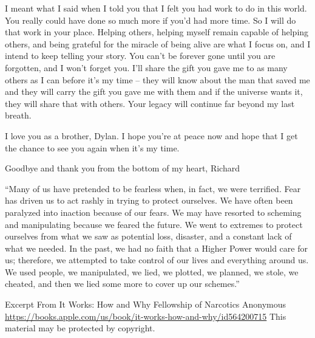 \documentclass[11pt]{article}
\begin{document}
I meant what I said when I told you that I felt you had work to do in this world.  You really could have done so much more if you'd had more time. So I will do that work in your place.   Helping others, helping myself remain capable of helping others, and being grateful for the miracle of being alive are what I focus on, and I intend to keep telling your story. You can't be forever gone until you are forgotten, and I won't forget you.  I'll share the gift you gave me to as many others as I can before it's my time -- they will know about the man that saved me and they will carry the gift you gave me with them and if the universe wants it, they will share that with others.  Your legacy will continue far beyond my last breath.

I love you as a brother, Dylan. I hope you're at peace now and hope that I get the chance to see you again when it's my time.

Goodbye and thank you from the bottom of my heart,
Richard


“Many of us have pretended to be fearless when, in fact, we were terrified. Fear has driven us to act rashly in trying to protect ourselves. We have often been paralyzed into inaction because of our fears. We may have resorted to scheming and manipulating because we feared the future. We went to extremes to protect ourselves from what we saw as potential loss, disaster, and a constant lack of what we needed. In the past, we had no faith that a Higher Power would care for us; therefore, we attempted to take control of our lives and everything around us. We used people, we manipulated, we lied, we plotted, we planned, we stole, we cheated, and then we lied some more to cover up our schemes.”

Excerpt From
It Works: How and Why
Fellowship of Narcotics Anonymous
\url{https://books.apple.com/us/book/it-works-how-and-why/id564200715}
This material may be protected by copyright.
\end{document}
